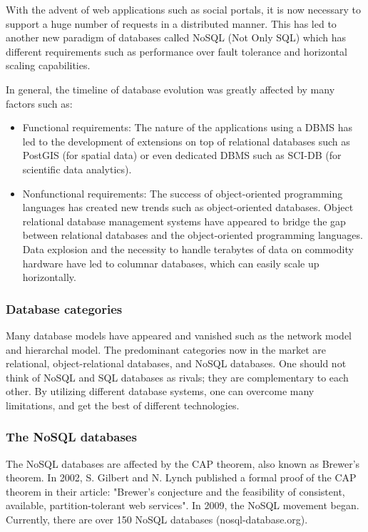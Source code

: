 With the advent of web applications such as social portals, it is now necessary to support a huge number of requests in a distributed manner. This has led to another new paradigm of databases called NoSQL (Not Only SQL) which has different requirements such as performance over fault tolerance and horizontal scaling capabilities.
\newline

In general, the timeline of database evolution was greatly affected by many factors such as:
\begin{itemize}
	\item Functional requirements: The nature of the applications using a DBMS has led to the development of extensions on top of relational databases such as PostGIS (for spatial data) or even dedicated DBMS such as SCI-DB (for scientific data analytics).
	\item Nonfunctional requirements: The success of object-oriented programming languages has created new trends such as object-oriented databases. Object relational database management systems have appeared to bridge the gap between relational databases and the object-oriented programming languages. Data explosion and the necessity to handle terabytes of data on commodity hardware have led to columnar databases, which can easily scale up horizontally.
\end{itemize}

\subsubsection*{Database categories}
Many database models have appeared and vanished such as the network model and hierarchal model. The predominant categories now in the market are relational, object-relational databases, and NoSQL databases. One should not think of NoSQL and SQL databases as rivals; they are complementary to each other. By utilizing different database systems, one can overcome many limitations, and get the best of different technologies.

\subsubsection*{The NoSQL databases}
The NoSQL databases are affected by the CAP theorem, also known as Brewer's theorem. In 2002, S. Gilbert and N. Lynch published a formal proof of the CAP theorem in their article: "Brewer's conjecture and the feasibility of consistent, available, partition-tolerant web services". In 2009, the NoSQL movement began. Currently, there are over 150 NoSQL databases (nosql-database.org).

